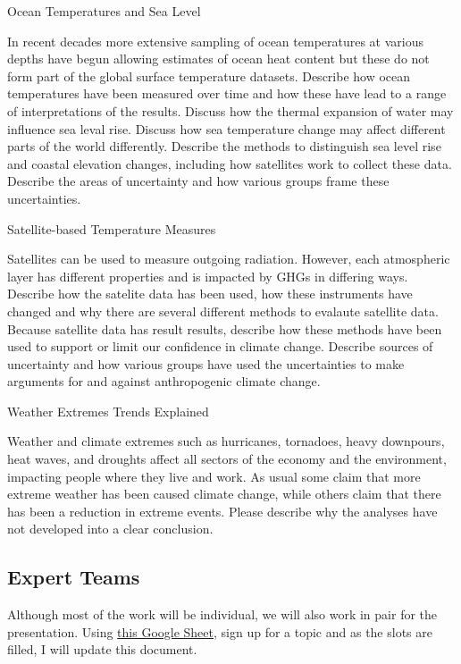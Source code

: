 \documentclass{article}\usepackage[]{graphicx}\usepackage[]{color}
\newenvironment{enumerate*}%
  {\begin{enumerate}%
    \setlength{\itemsep}{0pt}%
    \setlength{\parskip}{0pt}}%
  {\end{enumerate}}
\begin{document}
\begin{enumerate*}
  \item Ocean Temperatures and Sea Level

In recent decades more extensive sampling of ocean temperatures at various depths have begun allowing estimates of ocean heat content but these do not form part of the global surface temperature datasets. Describe how ocean temperatures have been measured over time and how these have lead to a range of interpretations of the results. Discuss how the thermal expansion of water may influence sea leval rise. Discuss how sea temperature change may affect different parts of the world differently. Describe the methods to distinguish sea level rise and coastal elevation changes, including how satellites work to collect these data. Describe the areas of uncertainty and how various groups frame these uncertainties.

  \item Satellite-based Temperature Measures
  
Satellites can be used to measure outgoing radiation. However, each atmospheric layer has different properties and is impacted by GHGs in differing ways. Describe how the satelite data has been used, how these instruments have changed and why there are several different methods to evalaute satellite data. Because satellite data has result results, describe how these methods have been used to support or limit our confidence in climate change. Describe sources of uncertainty and how various groups have used the uncertainties to make arguments for and against anthropogenic climate change.
  
  \item Weather Extremes Trends Explained
  
Weather and climate extremes such as hurricanes, tornadoes, heavy downpours, heat waves, and droughts affect all sectors of the economy and the environment, impacting people where they live and work. As usual some claim that more extreme weather has been caused climate change, while others claim that there has been a reduction in extreme events. Please describe why the analyses have not developed into a clear conclusion. 
  
\end{enumerate*}

\subsection{Expert Teams}

Although most of the work will be individual, we will also work in pair for the presentation. Using \href{https://docs.google.com/spreadsheets/d/1VkY8-js4QNeYz6gHXNzKOwVvB2EUkp7Y2BwjRrsfxOk/edit?usp=sharing}{this Google Sheet}, sign up for a topic and as the slots are filled, I will update this document. 
\end{document}

